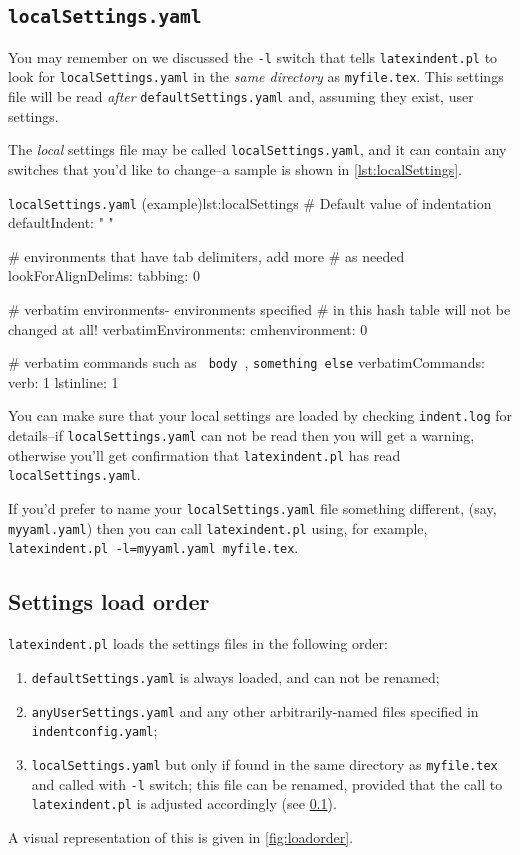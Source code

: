 \documentclass[11pt]{article}
\newcommand{\fixthis}[1]
{%
	\marginpar{\huge \color{red} \framebox{FIX}}%
	\typeout{FIXTHIS: p\thepage : #1^^J}%
}
\begin{document}
\subsection{\lstinline!localSettings.yaml!}\label{sec:localsettings}
You may remember on  we discussed the \lstinline!-l! switch
that tells \lstinline!latexindent.pl! to look for \lstinline!localSettings.yaml! in the
\emph{same directory} as \lstinline!myfile.tex!. This settings file will
be read \emph{after} \lstinline!defaultSettings.yaml! and, assuming they exist,
user settings.

The \emph{local} settings file may be called \lstinline!localSettings.yaml!, and
it can contain any switches that you'd
like to change--a sample is shown in \cref{lst:localSettings}.

\begin{cmhlistings}[style=yaml]{\lstinline!localSettings.yaml! (example)}{lst:localSettings}
# Default value of indentation
defaultIndent: " "

# environments that have tab delimiters, add more
# as needed
lookForAlignDelims:
   tabbing: 0

#  verbatim environments- environments specified
#  in this hash table will not be changed at all!
verbatimEnvironments:
    cmhenvironment: 0
\end{cmhlistings}

\fixthis{expand on this!}
#  verbatim commands such as \verb! body !, \lstinline$something else$
verbatimCommands:
    verb: 1
    lstinline: 1

You can make sure that your local settings are loaded by checking \lstinline!indent.log!
for details--if \lstinline!localSettings.yaml! can not be read then you will
get a warning, otherwise you'll get confirmation that
\lstinline!latexindent.pl! has read \lstinline!localSettings.yaml!.

If you'd prefer to name your \lstinline!localSettings.yaml! file something different, (say, \lstinline!myyaml.yaml!) then
you can call \lstinline!latexindent.pl! using, for example, \lstinline[breaklines=true]!latexindent.pl -l=myyaml.yaml myfile.tex!.

\subsection{Settings load order}\label{sec:loadorder}
\lstinline!latexindent.pl! loads the settings files in the following order:
\begin{enumerate}
	\item \lstinline!defaultSettings.yaml! is always loaded, and can not be renamed;
	\item \lstinline!anyUserSettings.yaml! and any other arbitrarily-named files specified in \lstinline!indentconfig.yaml!;
	\item \lstinline!localSettings.yaml! but only if found in the same directory as \lstinline!myfile.tex! and called
	      with \lstinline!-l! switch; this file can be renamed, provided that the call to \lstinline!latexindent.pl! is adjusted 
          accordingly (see \cref{sec:localsettings}).
\end{enumerate}
A visual representation of this is given in \cref{fig:loadorder}.
\end{document}
